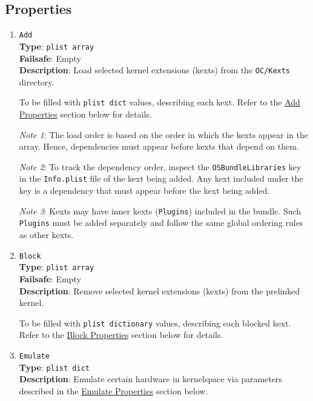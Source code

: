 \documentclass[]{article}
\makeatletter
\renewcommand{\label}[1]{%
\zref@wrapper@immediate{\oldlabel{#1}}}  %
\makeatother
\begin{document}
\subsection{Properties}\label{kernelprops}

\begin{enumerate}
\item
  \texttt{Add}\\
  \textbf{Type}: \texttt{plist\ array}\\
  \textbf{Failsafe}: Empty\\
  \textbf{Description}: Load selected kernel extensions (kexts) from the \texttt{OC/Kexts} directory.

  To be filled with \texttt{plist\ dict} values, describing each kext. Refer to
  the \hyperref[kernelpropsadd]{Add Properties} section below for details.

  \emph{Note 1}: The load order is based on the order in which the kexts appear in
  the array. Hence, dependencies must appear before kexts that depend on them.

  \emph{Note 2}: To track the dependency order, inspect the \texttt{OSBundleLibraries}
  key in the \texttt{Info.plist} file of the kext being added. Any kext included
  under the key is a dependency that must appear before the kext being added.

  \emph{Note 3}: Kexts may have inner kexts (\texttt{Plugins}) included in the bundle.
  Such \texttt{Plugins} must be added separately and follow the same global ordering
  rules as other kexts.

\item
  \texttt{Block}\\
  \textbf{Type}: \texttt{plist\ array}\\
  \textbf{Failsafe}: Empty\\
  \textbf{Description}: Remove selected kernel extensions (kexts) from the prelinked kernel.

  To be filled with \texttt{plist\ dictionary} values, describing each blocked kext.
  Refer to the \hyperref[kernelpropsblock]{Block Properties} section below for details.

\item
  \texttt{Emulate}\\
  \textbf{Type}: \texttt{plist\ dict}\\
  \textbf{Description}: Emulate certain hardware in kernelspace via parameters
  described in the \hyperref[kernelpropsemu]{Emulate Properties} section below.


\end{enumerate}
\end{document}
